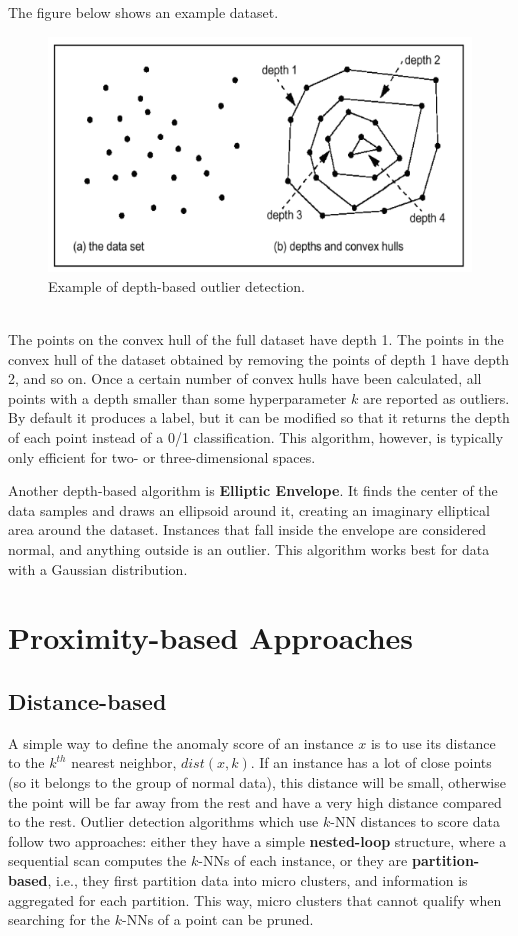 The figure below shows an example dataset.
\begin{figure}[h]
    \centering
    \includegraphics[width=0.5\linewidth]{img/depth_based_od.png}
    \caption{Example of depth-based outlier detection.}
    \label{fig:depth-od}
\end{figure} \\
The points on the convex hull of the full dataset have depth 1. The points in the convex hull of the dataset obtained by removing the points of depth 1 have depth 2, and so on. Once a certain number of convex hulls have been calculated, all points with a depth smaller than some hyperparameter $k$ are reported as outliers. By default it produces a label, but it can be modified so that it returns the depth of each point instead of a 0/1 classification. This algorithm, however, is typically only efficient for two- or three-dimensional spaces. 

Another depth-based algorithm is \textbf{Elliptic Envelope}. It finds the center of the data samples and draws an ellipsoid around it, creating an imaginary elliptical area around the dataset. Instances that fall inside the envelope are considered normal, and anything outside is an outlier. This algorithm works best for data with a Gaussian distribution.

\section{Proximity-based Approaches}

\subsection{Distance-based}

A simple way to define the anomaly score of an instance $x$ is to use its distance to the $k^{th}$ nearest neighbor, $\textit{dist}(x,k)$. If an instance has a lot of close points (so it belongs to the group of normal data), this distance will be small, otherwise the point will be far away from the rest and have a very high distance compared to the rest. Outlier detection algorithms which use $k$-NN distances to score data follow two approaches: either they have a simple \textbf{nested-loop} structure, where a sequential scan computes the $k$-NNs of each instance, or they are \textbf{partition-based}, i.e., they first partition data into micro clusters, and information is aggregated for each partition. This way, micro clusters that cannot qualify when searching for the $k$-NNs of a point can be pruned.

